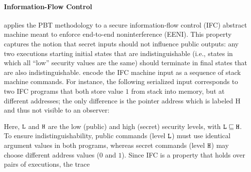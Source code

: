 \paragraph{Information-Flow Control}
  \citet{pbt-ifc} applies the PBT methodology to a secure
  information-flow control (IFC) abstract machine meant to enforce
  end-to-end noninterference (EENI).  This property captures the
  notion that secret inputs should not influence public outputs: any
  two executions starting initial states that are indistinguishable
  (i.e., states in which all ``low'' security values are the same)
  should terminate in final states that are also indistinguishable.
  \citet{pbt-ifc} encode the IFC machine input as a sequence of stack
  machine commands.  For instance, the following serialized input
  corresponds to two IFC programs that both store value $1$ from stack
  into memory, but at different addresses; the only difference is the
  pointer address which is labeled \textsf{H} and thus not visible to
  an observer: \vspace{-.4cm} \par{}\vspace{-.5cm} \par\nobreak\noindent
Here, ${\tt L}$ and ${\tt H}$ are the low (public) and high (secret)
security levels, with ${\tt L} \sqsubseteq {\tt H}$.  To ensure
indistinguishability, public commands (level ${\tt L}$) must use
identical argument values in both programs, whereas secret commands
(level ${\tt H}$) may choose different address values ($0$ and $1$).
Since IFC is a property that holds over pairs of executions, the trace
